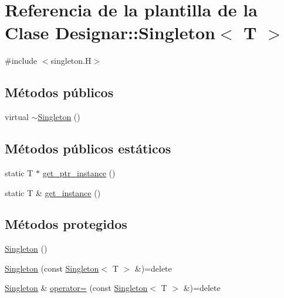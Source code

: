 \hypertarget{class_designar_1_1_singleton}{}\section{Referencia de la plantilla de la Clase Designar\+:\+:Singleton$<$ T $>$}
\label{class_designar_1_1_singleton}


{\ttfamily \#include $<$singleton.\+H$>$}

\subsection*{Métodos públicos}
\begin{DoxyCompactItemize}
\item 
virtual \hyperlink{class_designar_1_1_singleton_abf7976824a492dd42ed608bcafb8d98d}{$\sim$\+Singleton} ()
\end{DoxyCompactItemize}
\subsection*{Métodos públicos estáticos}
\begin{DoxyCompactItemize}
\item 
static T $\ast$ \hyperlink{class_designar_1_1_singleton_a4246f5f346bda552c3f0b317792d2fe5}{get\+\_\+ptr\+\_\+instance} ()
\item 
static T \& \hyperlink{class_designar_1_1_singleton_a747ab94efeaa0d985c194c2f91616075}{get\+\_\+instance} ()
\end{DoxyCompactItemize}
\subsection*{Métodos protegidos}
\begin{DoxyCompactItemize}
\item 
\hyperlink{class_designar_1_1_singleton_ad2cc3d3b4ee614f4dd63bda386638f66}{Singleton} ()
\item 
\hyperlink{class_designar_1_1_singleton_a961a62f81db43d2b610949a76f9645f2}{Singleton} (const \hyperlink{class_designar_1_1_singleton}{Singleton}$<$ T $>$ \&)=delete
\item 
\hyperlink{class_designar_1_1_singleton}{Singleton} \& \hyperlink{class_designar_1_1_singleton_a8968c625d740c01211ec483142e52a58}{operator=} (const \hyperlink{class_designar_1_1_singleton}{Singleton}$<$ T $>$ \&)=delete
\end{DoxyCompactItemize}


